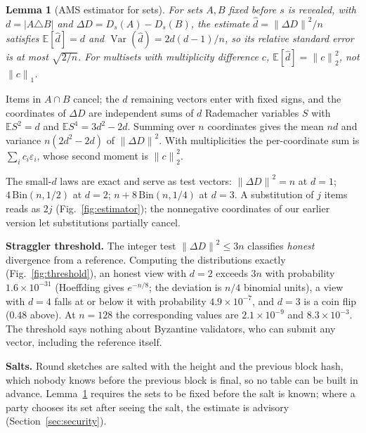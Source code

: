 \documentclass[journal]{IEEEtran}
\newtheorem{lemma}{Lemma}
\newcommand{\dd}{\ensuremath{\Delta D}}
\newcommand{\norm}[1]{\ensuremath{\lVert #1 \rVert}}
\begin{document}
\begin{lemma}[AMS estimator for sets]
\label{lem:unbiased}
For sets $A, B$ fixed before $s$ is revealed, with $d = |A \triangle B|$
and $\dd = D_{s}(A) - D_{s}(B)$, the estimate $\hat d = \norm{\dd}^{2}/n$
satisfies $\mathbb{E}[\hat d] = d$ and $\operatorname{Var}(\hat d) =
2d(d-1)/n$, so its relative standard error is at most $\sqrt{2/n}$. For
multisets with multiplicity difference $c$, $\mathbb{E}[\hat d] =
\norm{c}_{2}^{2}$, not $\norm{c}_{1}$.
\end{lemma}

\begin{IEEEproof}
Items in $A \cap B$ cancel; the $d$ remaining vectors enter with fixed
signs, and the coordinates of $\dd$ are independent sums of $d$
Rademacher variables $S$ with $\mathbb{E}S^{2} = d$ and $\mathbb{E}S^{4} =
3d^{2} - 2d$. Summing over $n$ coordinates gives the mean $nd$ and
variance $n(2d^{2} - 2d)$ of $\norm{\dd}^{2}$. With multiplicities the
per-coordinate sum is $\sum_{i} c_{i}\varepsilon_{i}$, whose second
moment is $\norm{c}_{2}^{2}$.
\end{IEEEproof}

The small-$d$ laws are exact and serve as test vectors: $\norm{\dd}^{2}
= n$ at $d = 1$; $4\,\mathrm{Bin}(n, 1/2)$ at $d = 2$; $n +
8\,\mathrm{Bin}(n, 1/4)$ at $d = 3$. A substitution of $j$ items reads as
$2j$ (Fig.~\ref{fig:estimator}); the nonnegative coordinates of our
earlier version let substitutions partially cancel.

\textbf{Straggler threshold.} The integer test $\norm{\dd}^{2} \le 3n$
classifies \emph{honest} divergence from a reference. Computing the
distributions exactly (Fig.~\ref{fig:threshold}), an honest view with
$d = 2$ exceeds $3n$ with probability $1.6 \times 10^{-31}$ (Hoeffding
gives $e^{-n/8}$; the deviation is $n/4$ binomial units), a view with
$d = 4$ falls at or below it with probability $4.9 \times 10^{-7}$, and
$d = 3$ is a coin flip ($0.48$ above). At $n = 128$ the corresponding
values are $2.1 \times 10^{-9}$ and $8.3 \times 10^{-3}$. The threshold
says nothing about Byzantine validators, who can submit any vector,
including the reference itself.

\textbf{Salts.} Round sketches are salted with the height and the
previous block hash, which nobody knows before the previous block is
final, so no table can be built in advance. Lemma~\ref{lem:unbiased}
requires the sets to be fixed before the salt is known; where a party
chooses its set after seeing the salt, the estimate is advisory
(Section~\ref{sec:security}).
\end{document}
